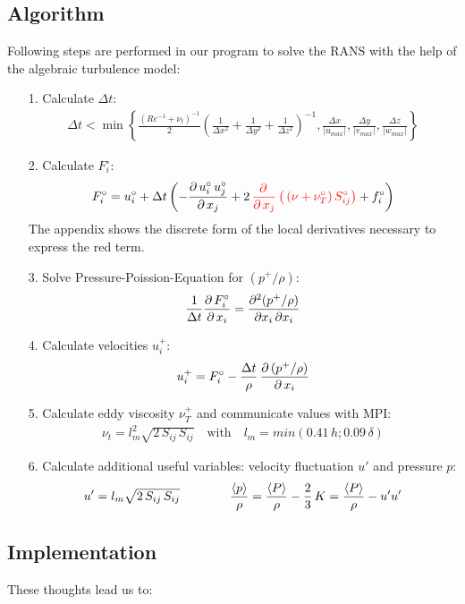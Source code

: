 \documentclass[11pt,a4paper]{article}
\begin{document}
\subsection{Algorithm}\label{sec:algorithm}
Following steps are performed in our program to solve the RANS with the help of the algebraic turbulence model:
\begin{itemize}
\item[1.] Calculate $\Delta t$:
\begin{align}
\Delta t < \min\left\lbrace
\frac{\left( Re^{-1}+\nu_t \right)^{-1}}{2}\left(
\frac{1}{\Delta x^2}+
\frac{1}{\Delta y^2}+
\frac{1}{\Delta z^2}
\right)^{-1}
,
\frac{\Delta x}{|u_{max}|},
\frac{\Delta y}{|v_{max}|},
\frac{\Delta z}{|w_{max}|}
\right\rbrace
\end{align}
\item[2.] Calculate $F_i^\circ$:
\begin{align}
F_i^\circ=u_i^\circ+\Delta t\left(-\frac{\partial \, u_i^\circ\,u_j^\circ}{\partial \, x_j} +2\,\textcolor{red}{\frac{\partial \, }{\partial \, x_j} \left( \,\left(\nu+\nu_T^\circ\right)S_{ij}^\circ\right)}+f_i^\circ  \right)
\end{align}
The appendix shows the discrete form of the local derivatives necessary to express the red term.
\item[3.] Solve Pressure-Poission-Equation for $(p^+/\rho)$:
\begin{align}
\frac{1}{\Delta t} \frac{\partial \, F_i^\circ}{\partial \, x_i}  =
\frac{\partial^2 (p^+/\rho)}{\partial x_i\,\partial x_i}
\end{align}
\item[4.] Calculate velocities $u_i^+$:
\begin{align}
u_i^+
=F_i^\circ-\frac{\Delta t}{\rho}\,\frac{\partial \, (p^+/\rho)}{\partial \, x_i}
\end{align}
\item[5.] Calculate eddy viscosity $\nu_T^+$ and communicate values with MPI:
\begin{align}
\nu_{t}=l_m^2\sqrt{2\,S_{ij}\,S_{ij}}\quad\text{with} \quad l_m=min(0.41\,h;0.09\,\delta)
\end{align}
\item[6.] Calculate additional useful variables: velocity fluctuation $u'$ and pressure $p$:
\begin{align}
u'=l_m\sqrt{2\,S_{ij}\,S_{ij}}\qquad\qquad
\frac{\left\langle p\right\rangle}{\rho}=\frac{\left\langle P\right\rangle}{\rho}-\frac{2}{3}\,K=\frac{\left\langle P\right\rangle}{\rho}-u'u'
\end{align}
\end{itemize}

\clearpage
\subsection{Implementation}
These thoughts lead us to:
\end{document}
